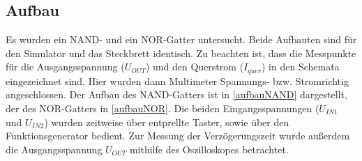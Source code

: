 \documentclass[11pt, a4paper]{article}
\begin{document}
\subsection*{Aufbau}
Es wurden ein NAND- und ein NOR-Gatter untersucht. Beide Aufbauten sind für den Simulator und das Steckbrett identisch.
Zu beachten ist, dass die Messpunkte für die Ausgangsspannung ($U_{OUT}$) und den Querstrom ($I_{quer}$) in den Schemata eingezeichnet sind. Hier wurden dann Multimeter Spannungs- bzw. Stromrichtig angeschlossen.
Der Aufbau des NAND-Gatters ist in \autoref{aufbauNAND} dargestellt, der des NOR-Gatters in \autoref{aufbauNOR}. Die beiden Eingangsspannungen ($U_{IN1}$ und $U_{IN2}$) wurden zeitweise über entprellte Taster, sowie über den Funktionsgenerator bedient.
Zur Messung der Verzögerungszeit wurde außerdem die Ausgangsspannung $U_{OUT}$ mithilfe des Oszilloskopes betrachtet.
\end{document}
